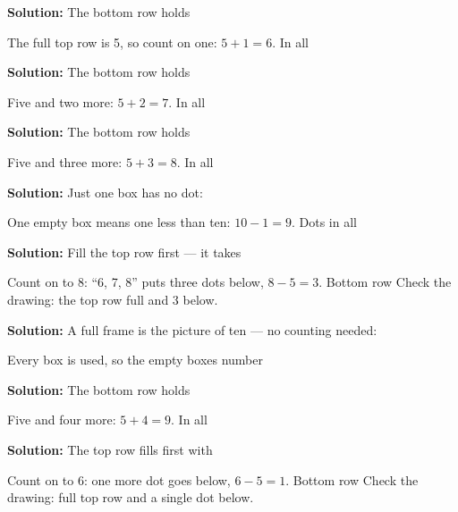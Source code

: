 \documentclass[12pt]{article}
\begin{document}



\textbf{Solution:} The bottom row holds 

The full top row is 5, so count on one: $5 + 1 = 6$. In all 


\textbf{Solution:} The bottom row holds 

Five and two more: $5 + 2 = 7$. In all 


\textbf{Solution:} The bottom row holds 

Five and three more: $5 + 3 = 8$. In all 


\textbf{Solution:} Just one box has no dot: 

One empty box means one less than ten: $10 - 1 = 9$. Dots in all 


\textbf{Solution:} Fill the top row first --- it takes 

Count on to 8: ``6, 7, 8'' puts three dots below, $8 - 5 = 3$. Bottom row
 \quad Check the drawing: the top row full and 3 below.


\textbf{Solution:} A full frame is the picture of ten --- no counting needed:

Every box is used, so the empty boxes number 


\textbf{Solution:} The bottom row holds 

Five and four more: $5 + 4 = 9$. In all 


\textbf{Solution:} The top row fills first with 

Count on to 6: one more dot goes below, $6 - 5 = 1$. Bottom row 
\quad Check the drawing: full top row and a single dot below.
\end{document}
